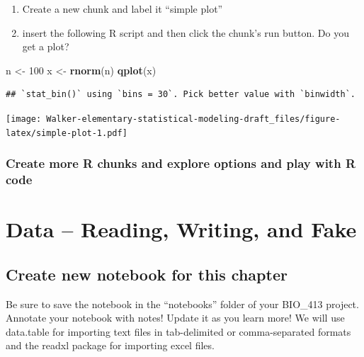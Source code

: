 \documentclass[]{book}
\newenvironment{Shaded}{\begin{snugshade}}{\end{snugshade}}
\newcommand{\KeywordTok}[1]{\textcolor[rgb]{0.13,0.29,0.53}{\textbf{#1}}}
\newcommand{\DataTypeTok}[1]{\textcolor[rgb]{0.13,0.29,0.53}{#1}}
\newcommand{\DecValTok}[1]{\textcolor[rgb]{0.00,0.00,0.81}{#1}}
\newcommand{\StringTok}[1]{\textcolor[rgb]{0.31,0.60,0.02}{#1}}
\newcommand{\OperatorTok}[1]{\textcolor[rgb]{0.81,0.36,0.00}{\textbf{#1}}}
\newcommand{\NormalTok}[1]{#1}
\providecommand{\tightlist}{%
  \setlength{\itemsep}{0pt}\setlength{\parskip}{0pt}}
\theoremstyle{definition}
\theoremstyle{definition}
\theoremstyle{definition}
\theoremstyle{remark}
\begin{document}
\begin{enumerate}
\def\labelenumi{\arabic{enumi}.}
\setcounter{enumi}{3}
\tightlist
\item
  Create a new chunk and label it ``simple plot''
\item
  insert the following R script and then click the chunk's run button.
  Do you get a plot?
\end{enumerate}

\begin{Shaded}
\begin{Highlighting}[]
\NormalTok{n <-}\StringTok{ }\DecValTok{100}
\NormalTok{x <-}\StringTok{ }\KeywordTok{rnorm}\NormalTok{(n)}
\KeywordTok{qplot}\NormalTok{(x)}
\end{Highlighting}
\end{Shaded}

\begin{verbatim}
## `stat_bin()` using `bins = 30`. Pick better value with `binwidth`.
\end{verbatim}

\texttt{[image: Walker-elementary-statistical-modeling-draft\_files/figure-latex/simple-plot-1.pdf]}

\subsection{Create more R chunks and explore options and play with R
code}\label{create-more-r-chunks-and-explore-options-and-play-with-r-code}

\chapter{Data -- Reading, Writing, and
Fake}\label{data-reading-writing-and-fake}

\section{Create new notebook for this
chapter}\label{create-new-notebook-for-this-chapter}

Be sure to save the notebook in the ``notebooks'' folder of your
BIO\_413 project. Annotate your notebook with notes! Update it as you
learn more! We will use data.table for importing text files in
tab-delimited or comma-separated formats and the readxl package for
importing excel files.

\begin{Shaded}
\end{Shaded}
\end{document}
